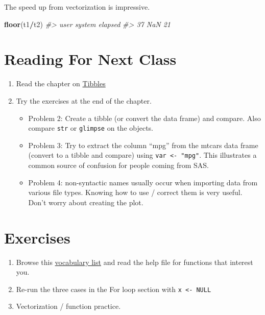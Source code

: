 \documentclass[]{book}
\newenvironment{Shaded}{\begin{snugshade}}{\end{snugshade}}
\newcommand{\KeywordTok}[1]{\textcolor[rgb]{0.13,0.29,0.53}{\textbf{#1}}}
\newcommand{\CommentTok}[1]{\textcolor[rgb]{0.56,0.35,0.01}{\textit{#1}}}
\newcommand{\OperatorTok}[1]{\textcolor[rgb]{0.81,0.36,0.00}{\textbf{#1}}}
\newcommand{\NormalTok}[1]{#1}
\providecommand{\tightlist}{%
  \setlength{\itemsep}{0pt}\setlength{\parskip}{0pt}}
\begin{document}
The speed up from vectorization is impressive.

\begin{Shaded}
\begin{Highlighting}[]
\KeywordTok{floor}\NormalTok{(t1}\OperatorTok{/}\NormalTok{t2)}
\CommentTok{#>    user  system elapsed }
\CommentTok{#>      37     NaN      21}
\end{Highlighting}
\end{Shaded}

\section{Reading For Next Class}\label{reading-for-next-class-1}

\begin{enumerate}
\def\labelenumi{\arabic{enumi}.}
\tightlist
\item
  Read the chapter on \href{http://r4ds.had.co.nz/tibbles.html}{Tibbles}
\item
  Try the exercises at the end of the chapter.

  \begin{itemize}
  \tightlist
  \item
    Problem 2: Create a tibble (or convert the data frame) and compare.
    Also compare \texttt{str} or \texttt{glimpse} on the objects.
  \item
    Problem 3: Try to extract the column ``mpg'' from the mtcars data
    frame (convert to a tibble and compare) using
    \texttt{var\ \textless{}-\ "mpg"}. This illustrates a common source
    of confusion for people coming from SAS.
  \item
    Problem 4: non-syntactic names usually occur when importing data
    from various file types. Knowing how to use / correct them is very
    useful. Don't worry about creating the plot.
  \end{itemize}
\end{enumerate}

\section{Exercises}\label{exercises-1}

\begin{enumerate}
\def\labelenumi{\arabic{enumi}.}
\tightlist
\item
  Browse this \href{http://adv-r.had.co.nz/Vocabulary.html}{vocabulary
  list} and read the help file for functions that interest you.
\item
  Re-run the three cases in the For loop section with
  \texttt{x\ \textless{}-\ NULL}
\item
  Vectorization / function practice.
\end{enumerate}
\end{document}

